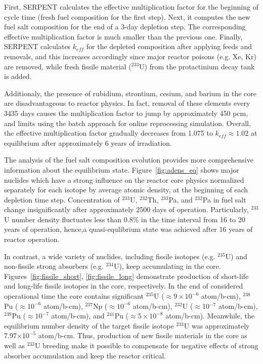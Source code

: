 First, SERPENT calculates the effective multiplication factor for the beginning of cycle time (fresh fuel composition for the first step). Next, it computes the new fuel salt composition for the end of a 3-day depletion step. The corresponding effective multiplication factor is much smaller than the previous one. Finally, SERPENT calculates $k_{eff}$ for the depleted composition after applying feeds and removals, and this increases accordingly since major reactor poisons (e.g. Xe, Kr) are removed, while fresh fissile material ($^{233}$U) from the protactinium decay tank is added. 

Additionaly, the presence of rubidium, strontium, cesium, and barium in the core are disadvantageous to reactor physics. In fact, removal of these elements every 3435 days causes the multiplication factor to jump by approximately 450 pcm, and limits using the batch approach for online reprocessing simulation. Overall, the effective multiplication factor gradually decreases from 1.075 to $k_{eff} \approx 1.02$ at equilibrium after approximately 6 years of irradiation. 

The analysis of the fuel salt composition evolution provides more comprehensive information about the equilibrium state. Figure~\ref{fig:adens_eq} shows major nuclides which have a strong influence on the reactor core physics normalized separately for each isotope by average atomic density, at the beginning of each depletion time step. Concentration of $^{233}$U, $^{232}$Th, $^{233}$Pa, and $^{232}$Pa in fuel salt change insignificantly after approximately 2500 days of operation. Particularly, $^{233}$U number density fluctuates less than 0.8\% in the time interval from 16 to 20 years of operation, hence,a quasi-equlibrium state was achieved after 16 years of reactor operation.

In contrast, a wide variety of nuclides, including fissile isotopes (e.g. $^{235}$U) and non-fissile strong absorbers (e.g. $^{234}$U), keep accumulating in the core. Figures~\ref{fig:fissile_short}, \ref{fig:fissile_long} demonstrate production of short-life and long-life fissile isotopes in the core, respectively. In the end of considered operational time the core contains significant $^{235}$U ($\approx 9\times10^{-6}$ atom/b-cm), $^{238}$Pu ($\approx 10^{-6}$ atom/b-cm), $^{237}$Np ($\approx10^{-6}$ atom/b-cm), $^{232}$U ($\approx$10$^{-7}$ atom/b-cm), $^{239}$Pu ($\approx10^{-7}$ atom/b-cm), and $^{241}$Pu ($\approx 5\times10^{-8}$ atom/b-cm). Meanwhile, the equilibrium number density of the target fissile isotope $^{233}$U was approximately 7.97$\times10^{-5}$ atom/b-cm. Thus, production of new fissile materials in the core as well as $^{233}$U breeding make it possible to compensate for negative effects of strong absorber accumulation and keep the reactor critical.

